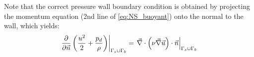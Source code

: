 Note that the correct pressure wall boundary condition is obtained by projecting the momentum equation (2nd line of \eqref{eq:NS_buoyant}) onto the normal to the wall, which yields:
\begin{equation}\label{eq:wallBCs_p}
  \left.\dfrac{\partial}{\partial \vec n}\left(\dfrac{u^2}{2} + \dfrac{p_d}{\rho}\right)\right|_{\Gamma_s\cup\Gamma_b} =
  \left.\vec{\nabla} \cdot \left(\nu \vec \nabla \vec u\right) \cdot \vec n\right|_{\Gamma_s\cup\Gamma_b}
\end{equation}

